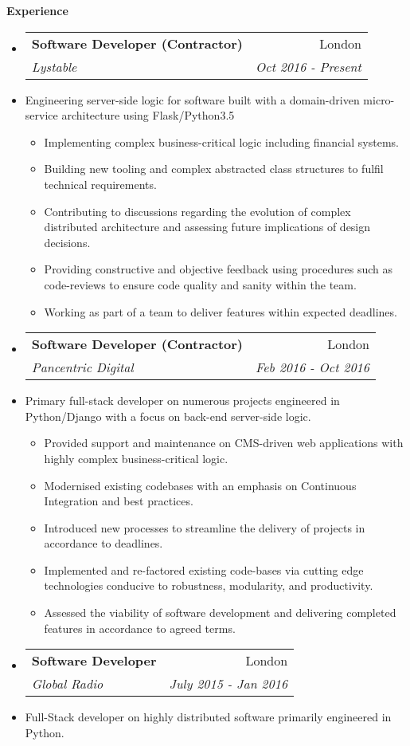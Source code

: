 \documentclass[letterpaper,11pt]{article}
\makeatletter
\newcommand{\resitem}[1]{\item #1 \vspace{-2pt}}
\newcommand{\resheading}[1]{{\large \colorbox{mygrey}
			{\begin{minipage}{\textwidth}
					{\textbf{#1 \vphantom{p\^{E}}}}
		\end{minipage}}}
	}
\newcommand{\ressubheading}[4]{
		\begin{tabular*}{180mm}{l@{\extracolsep{\fill}}r}
			\textbf{#1} & #2 \\
			\textit{#3} & \textit{#4} \\
		\end{tabular*}\vspace{-6pt}
	}
\newcommand{\resdescription}[1]{#1 \vspace{-0mm}}
\makeatother
\begin{document}
	\resheading{Experience}
	\begin{itemize}

		\item[]
            \ressubheading{Software Developer (Contractor)}{London}{Lystable}{Oct 2016 - Present}
		\item[]
			\resdescription{Engineering server-side logic for software built with a domain-driven micro-service architecture using Flask/Python3.5}
			\begin{itemize}
                    \resitem{Implementing complex business-critical logic including financial systems.}
                    \resitem{Building new tooling and complex abstracted class structures to fulfil technical requirements.}
					\resitem{Contributing to discussions regarding the evolution of complex distributed architecture and assessing future implications of design decisions.}
                    \resitem{Providing constructive and objective feedback using procedures such as code-reviews to ensure code quality and sanity within the team.}
					\resitem{Working as part of a team to deliver features within expected deadlines.}
			\end{itemize}
		\item[]
            \ressubheading{Software Developer (Contractor)}{London}{Pancentric Digital}{Feb 2016 - Oct 2016}
		\item[]
			\resdescription{Primary full-stack developer on numerous projects engineered in Python/Django with a focus on back-end server-side logic.}
			\begin{itemize}
                    \resitem{Provided support and maintenance on CMS-driven web applications with highly complex business-critical logic.}
                    \resitem{Modernised existing codebases with an emphasis on Continuous Integration and best practices.}
					\resitem{Introduced new processes to streamline the delivery of projects in accordance to deadlines.}
					\resitem{Implemented and re-factored existing code-bases via cutting edge technologies conducive to robustness, modularity, and productivity.}
					\resitem{Assessed the viability of software development and delivering completed features in accordance to agreed terms.}
			\end{itemize}
		\item[]
			\ressubheading{Software Developer}{London}{Global Radio}{July 2015 - Jan 2016}
		\item[]
			\resdescription{Full-Stack developer on highly distributed software primarily engineered in Python.}

\end{itemize}
\end{document}
